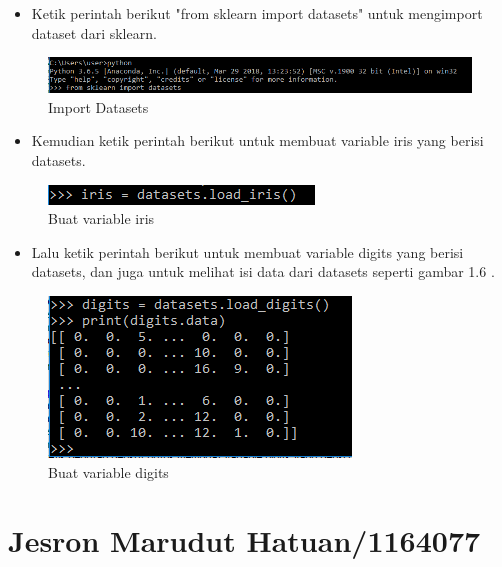 \begin{enumerate}
\begin{itemize}
\item Ketik perintah berikut "from sklearn import datasets" untuk mengimport dataset dari sklearn.
\end{itemize}
\begin{figure}[ht]
\centering
\includegraphics[scale=0.5]{figures/4.png}
\caption{Import Datasets}
\label{Import Datasets}
\end{figure}
\begin{itemize}
\item Kemudian ketik perintah berikut  untuk membuat variable iris yang berisi datasets.
\end{itemize}
\begin{figure}[ht]
\centering
\includegraphics[scale=0.9]{figures/5.png}
\caption{Buat variable iris}
\label{Variable Iris}
\end{figure}
\begin{itemize}
\item Lalu ketik perintah berikut untuk membuat variable digits yang berisi datasets, dan juga untuk melihat isi data dari datasets seperti gambar 1.6 .
\end{itemize}
\begin{figure}[ht]
\centering
\includegraphics[scale=0.7]{figures/8.png}
\caption{Buat variable digits}
\label{Variable Digits}
\end{figure}
\end{enumerate}

\section{Jesron Marudut Hatuan/1164077}
